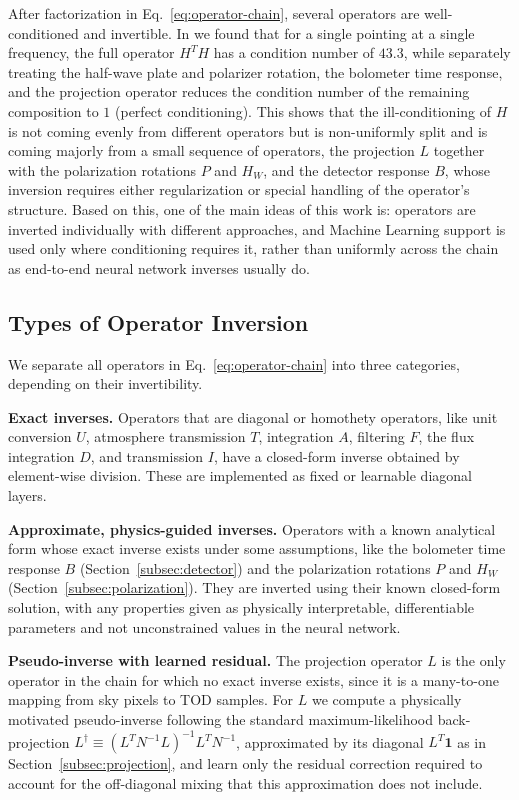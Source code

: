 \documentclass[a4paper,11pt]{article}
\begin{document}
After factorization in Eq.~\ref{eq:operator-chain}, several operators are well-conditioned and invertible. In \cite{kardum2025proceeding} we found
that for a single pointing at a single frequency, the full operator
$H^TH$ has a condition number of $43.3$, while separately treating the
half-wave plate and polarizer rotation, the bolometer time response,
and the projection operator reduces the condition number of the
remaining composition to $1$ (perfect conditioning). This
shows that the ill-conditioning of $H$ is not coming evenly from different operators but is non-uniformly split and is coming majorly from a small sequence of operators, the projection $L$ together with the polarization rotations $P$ and $H_W$, and the detector response $B$, whose inversion requires either regularization or special handling
of the operator's structure. Based on this, one of the main ideas of this work is: operators are inverted individually with different approaches, and Machine Learning support is used only where conditioning requires it, rather than uniformly across the chain as end-to-end neural network inverses usually do.

\subsection{Types of Operator Inversion}
\label{subsec:three-classes}

We separate all operators in Eq.~\ref{eq:operator-chain} into
three categories, depending on their invertibility.

\textbf{Exact inverses.} Operators that are diagonal or homothety
operators, like unit conversion $U$, atmosphere transmission $T$, integration $A$, filtering $F$, the flux integration $D$, and transmission $I$, have a closed-form inverse obtained by element-wise division. These are implemented as fixed or learnable diagonal layers.

\textbf{Approximate, physics-guided inverses.} Operators with a
known analytical form whose exact inverse exists under some assumptions, like the bolometer time response $B$ (Section~\ref{subsec:detector}) and the polarization rotations $P$ and $H_W$ (Section~\ref{subsec:polarization}). They are inverted using their known closed-form solution, with any properties given as physically interpretable, differentiable parameters and not unconstrained values in the neural network.

\textbf{Pseudo-inverse with learned residual.} The projection operator
$L$ is the only operator in the chain for which no exact inverse
exists, since it is a many-to-one mapping from sky pixels to TOD
samples. For $L$ we compute a physically motivated pseudo-inverse following the standard
maximum-likelihood back-projection $L^\dagger \equiv (L^TN^{-1}L)^{-1}L^TN^{-1}$,
approximated by its diagonal $L^T\mathbf{1}$ as in
Section~\ref{subsec:projection}, and learn only the residual correction required to account for the off-diagonal mixing that this
approximation does not include.
\end{document}
